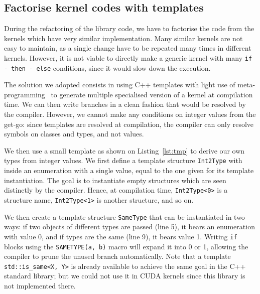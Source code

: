 
\subsection{Factorise kernel codes with templates}

During the refactoring of the library code, we have to factorise the code from the kernels which have very similar implementation. Many similar kernels are not easy to maintain, as a single change have to be repeated many times in different kernels. However, it is not viable to directly make a generic kernel with many \verb|if - then - else| conditions, since it would slow down the execution. 

The solution we adopted consists in using C++ templates with light use of meta-programming~\cite{wikibook:tmp} to generate multiple specialised version of a kernel at compilation time. We can then write branches in a clean fashion that would be resolved by the compiler. However, we cannot make any conditions on integer values from the get-go: since templates are resolved at compilation, the compiler can only resolve symbols on classes and types, and not values. 

We then use a small template as shown on Listing~\ref{lst:tmp} to derive our own types from integer values. We first define a template structure \verb|Int2Type| with inside an enumeration with a single value, equal to the one given for its template instantiation. The goal is to instantiate empty structures which are seen distinctly by the compiler. Hence, at compilation time, \verb|Int2Type<0>| is a structure name, \verb|Int2Type<1>| is another structure, and so on.

We then create a template structure \verb|SameType| that can be instantiated in two ways: if two objects of different types are passed (line 5), it bears an enumeration with value 0, and if types are the same (line 9), it bears value 1. Writing \verb|if| blocks using the \verb|SAMETYPE(a, b)| macro will expand it into 0 or 1, allowing the compiler to prune the unused branch automatically. Note that a template \verb|std::is_same<X, Y>| is already available to achieve the same goal in the C++ standard library; but we could not use it in CUDA kernels since this library is not implemented there.

